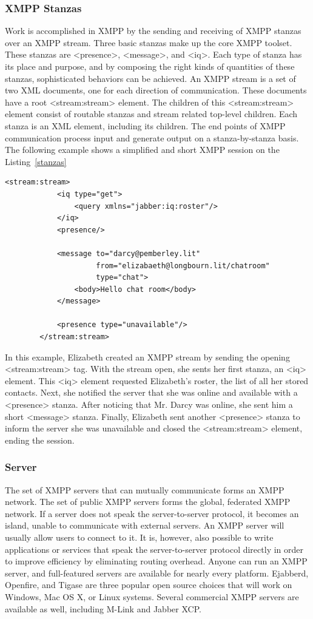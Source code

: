 	\subsubsection{XMPP Stanzas}
	Work is accomplished in XMPP by the sending and receiving of XMPP stanzas over an XMPP stream. Three basic stanzas make up the core XMPP toolset. These stanzas are <presence>, <message>, and <iq>. Each type of stanza has its place and purpose, and by composing the right kinds of quantities of these stanzas, sophisticated behaviors can be achieved. An XMPP stream is a set of two XML documents, one for each direction of communication. These documents have a root <stream:stream> element. The children of this <stream:stream> element consist of routable stanzas and stream related top-level children. Each stanza is an XML element, including its children. The end points of XMPP communication process input and generate output on a stanza-by-stanza basis. The following example shows a simplified and short XMPP session on the Listing~\ref{stanzas}
		\begin{lstlisting}[label=stanzas,caption=Stanzas Format]
		<stream:stream>
			<iq type="get">
				<query xmlns="jabber:iq:roster"/>
			</iq>
			<presence/>

			<message to="darcy@pemberley.lit"
					 from="elizabaeth@longbourn.lit/chatroom"
			         type="chat">
			    <body>Hello chat room</body>
			</message> 

			<presence type="unavailable"/>
		</stream:stream>
		\end{lstlisting}

	In this example, Elizabeth created an XMPP stream by sending the opening <stream:stream> tag. With the stream open, she sents her first stanza, an <iq> element. This <iq> element requested Elizabeth’s roster, the list of all her stored contacts. Next, she notified the server that she was online and available with a <presence> stanza. After noticing that Mr. Darcy was online, she sent him a short <message> stanza. Finally, Elizabeth sent another <presence> stanza to inform the server she was unavailable and closed the <stream:stream> element, ending the session.
    
    \subsubsection{Server}
	The set of XMPP servers that can mutually communicate forms an XMPP network. The set of public XMPP servers forms the global, federated XMPP network. If a server does not speak the server-to-server protocol, it becomes an island, unable to communicate with external servers. An XMPP server will usually allow users to connect to it. It is, however, also possible to write applications or services that speak the server-to-server protocol directly in order to improve efficiency by eliminating routing overhead. Anyone can run an XMPP server, and full-featured servers are available for nearly every platform. Ejabberd, Openfire, and Tigase are three popular open source choices that will work on Windows, Mac OS X, or Linux systems. Several commercial XMPP servers are available as well, including M-Link and Jabber XCP.
	
